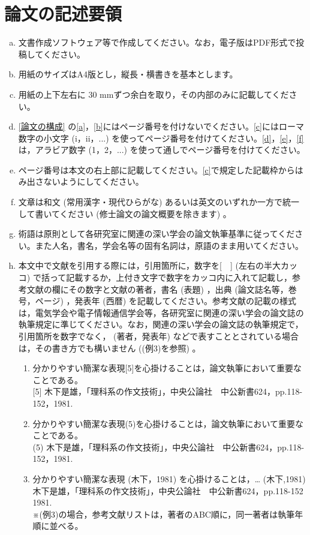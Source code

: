 \documentclass[12pt]{kupaper}
\begin{document}
\chapter{論文の記述要領}
\begin{enumerate}[a.]
	\item 文書作成ソフトウェア等で作成してください。なお，電子版はPDF形式で投稿してください。
	\item 用紙のサイズはA4版とし，縦長・横書きを基本とします。
	\item 用紙の上下左右に 30 mmずつ余白を取り，その内部のみに記載してください。
	\item \ref{論文の構成} の\ref{a}，\ref{b}にはページ番号を付けないでください。\ref{c}にはローマ数字の小文字 (i，ii，...) を使ってページ番号を付けてください。\ref{d}，\ref{e}，\ref{f}は，アラビア数字 (1，2，...) を使って通しでページ番号を付けてください。
	\item ページ番号は本文の右上部に記載してください。\ref{c}で規定した記載枠からはみ出さないようにしてください。
	\item 文章は和文 (常用漢字・現代ひらがな) あるいは英文のいずれか一方で統一して書いてください (修士論文の論文概要を除きます) 。
	\item 術語は原則として各研究室に関連の深い学会の論文執筆基準に従ってください。また人名，書名，学会名等の固有名詞は，原語のまま用いてください。
	\item 本文中で文献を引用する際には，引用箇所に，数字を[　] (左右の半大カッコ) で括って記載するか，上付き文字で数字をカッコ内に入れて記載し，参考文献の欄にその数字と文献の著者，書名 (表題) ，出典 (論文誌名等，巻号，ページ) ，発表年 (西暦) を記載してください。参考文献の記載の様式は，電気学会や電子情報通信学会等，各研究室に関連の深い学会の論文誌の執筆規定に準じてください。なお，関連の深い学会の論文誌の執筆規定で，引用箇所を数字でなく， (著者，発表年) などで表すこととされている場合は，その書き方でも構いません ((例3)を参照) 。

	      \begin{enumerate}[(例1)]
		      \item
		            分かりやすい簡潔な表現[5]を心掛けることは，論文執筆において重要なことである。\\
		            {[5]} 木下是雄，「理科系の作文技術」，中央公論社　中公新書624，pp.118-152，1981.
		      \item
		            分かりやすい簡潔な表現(5)を心掛けることは，論文執筆において重要なことである。\\
		            (5) 木下是雄，「理科系の作文技術」，中央公論社　中公新書624，pp.118-152，1981.
		      \item \label{例3}
		            分かりやすい簡潔な表現 (木下，1981) を心掛けることは，…
		            (木下,1981)  \\
		            木下是雄，「理科系の作文技術」，中央公論社　中公新書624，pp.118-152 1981.\\
		            ※(例3)の場合，参考文献リストは，著者のABC順に，同一著者は執筆年順に並べる。
	      \end{enumerate}


\end{enumerate}
\end{document}
